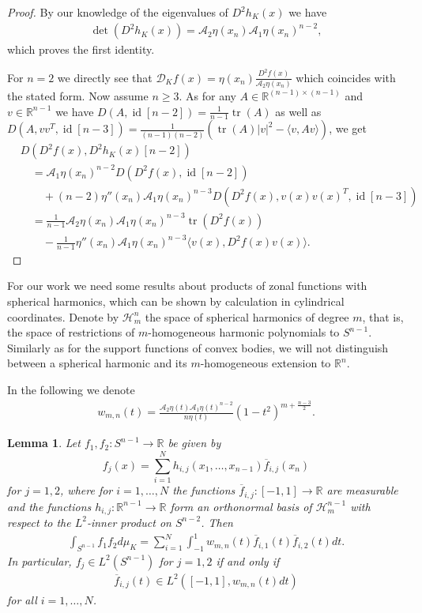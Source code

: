 \documentclass[12pt,twoside]{amsart}
\numberwithin{satz}{section}
\newtheorem{lemma}[satz]{Lemma}
\theoremstyle{definition}
\numberwithin{equation}{section}
\newcommand\R{\mathbb{R}}
\newcommand\id{\operatorname{id}}
\newcommand\tr{\operatorname{tr}}
\begin{document}
	\begin{proof}
		By our knowledge of the eigenvalues of $D^2h_K(x)$ we have 
		\begin{align*}
			\det(D^2h_K(x))=\mathcal{A}_2\eta(x_n)\mathcal{A}_1\eta(x_n)^{n-2},
		\end{align*}
		which proves the first identity.
		
		For $n=2$ we directly see that $\mathcal{D}_Kf(x)=\eta(x_n)\frac{D^2f(x)}{\mathcal{A}_2\eta(x_n)}$ which coincides with the stated form. Now assume $n\geq 3$. As for any $A\in\R^{(n-1)\times(n-1)}$ and $v\in\R^{n-1}$ we have $D(A,\id[n-2])=\frac{1}{n-1}\tr(A)$ as well as $D(A,vv^T,\id[n-3])=\frac{1}{(n-1)(n-2)}(\tr(A)|v|^2-\langle v,Av\rangle)$, we get
		\begin{align*}
			&D(D^2f(x),D^2h_K(x)[n-2])\\
			&\quad=\mathcal{A}_1\eta(x_n)^{n-2}D(D^2f(x),\id[n-2])\\
			& \quad \quad + (n-2)\eta''(x_n)\mathcal{A}_1\eta(x_n)^{n-3}D(D^2f(x),v(x) v(x)^T,\id[n-3]) \\
			& \quad = \frac{1}{n-1}\mathcal{A}_2\eta(x_n)\mathcal{A}_1\eta(x_n)^{n-3}\tr(D^2f(x)) \\
			& \quad \quad -\frac{1}{n-1}\eta''(x_n)\mathcal{A}_1\eta(x_n)^{n-3}\langle v(x),D^2f(x)v(x)\rangle.
		\end{align*}
	\end{proof}
	
	For our work we need some results about products of zonal functions with spherical harmonics, which can be shown by calculation in cylindrical coordinates. Denote by $\mathcal{H}_m^n$ the space of spherical harmonics of degree $m$, that is, the space of restrictions of $m$-homogeneous harmonic polynomials to $S^{n-1}$. Similarly as for the support functions of convex bodies, we will not distinguish between a spherical harmonic and its $m$-homogeneous extension to $\R^n$.
	
	In the following we denote 
	\begin{align*}
		w_{m,n}(t)=\frac{\mathcal{A}_2\eta(t)\mathcal{A}_1\eta(t)^{n-2}}{n\eta(t)}(1-t^2)^{m+\frac{n-3}{2}}.
	\end{align*}
	
	\begin{lemma}\label{lemma_Lp}
		Let $f_1,f_2:S^{n-1} \to\R$ be given by $$f_j(x)=\sum_{i=1}^Nh_{i,j}(x_1,\dots,x_{n-1})\overline{f}_{i,j}(x_n)$$ for $j=1,2$, where for $i=1,\dots,N$ the functions $\overline{f}_{i,j}:[-1,1]\to\R$ are measurable and the functions $h_{i,j}: \R^{n-1} \to \R$ form an orthonormal basis of $\mathcal{H}^{n-1}_m$ with respect to the $L^2$-inner product on $S^{n-2}$. Then 
		\begin{align*}
			\int_{S^{n-1}} f_1f_2d\mu_K = \sum_{i=1}^N \int_{-1}^1 w_{m,n}(t)\overline{f}_{i,1}(t)\overline{f}_{i,2}(t)dt.
		\end{align*}
		In particular, $f_j\in L^2(S^{n-1})$ for $j=1,2$ if and only if
		\begin{align*}
			\overline{f}_{i,j}(t)\in L^2\left([-1,1],w_{m,n}(t)dt\right)
		\end{align*}
		for all $i=1,\dots,N$.
	\end{lemma}
	
\end{document}
